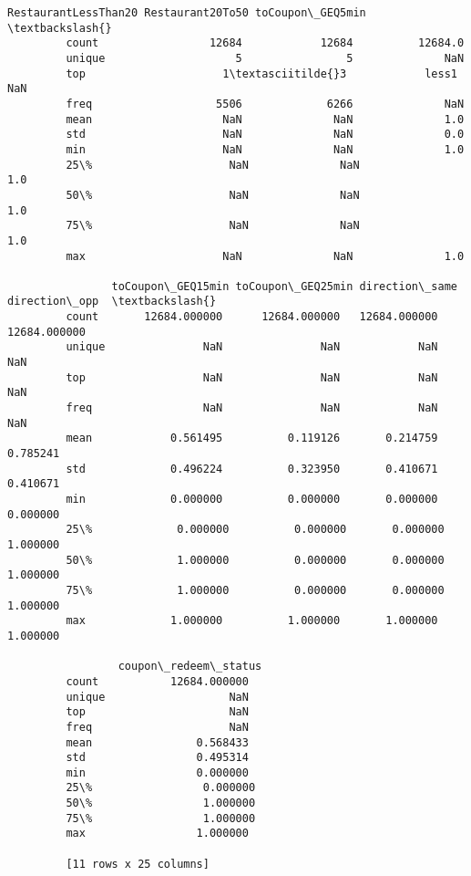 \documentclass[11pt]{article}
\begin{document}
\begin{Verbatim}[commandchars=\\\{\}]
                RestaurantLessThan20 Restaurant20To50 toCoupon\_GEQ5min  \textbackslash{}
         count                 12684            12684          12684.0   
         unique                    5                5              NaN   
         top                     1\textasciitilde{}3            less1              NaN   
         freq                   5506             6266              NaN   
         mean                    NaN              NaN              1.0   
         std                     NaN              NaN              0.0   
         min                     NaN              NaN              1.0   
         25\%                     NaN              NaN              1.0   
         50\%                     NaN              NaN              1.0   
         75\%                     NaN              NaN              1.0   
         max                     NaN              NaN              1.0   
         
                toCoupon\_GEQ15min toCoupon\_GEQ25min direction\_same direction\_opp  \textbackslash{}
         count       12684.000000      12684.000000   12684.000000  12684.000000   
         unique               NaN               NaN            NaN           NaN   
         top                  NaN               NaN            NaN           NaN   
         freq                 NaN               NaN            NaN           NaN   
         mean            0.561495          0.119126       0.214759      0.785241   
         std             0.496224          0.323950       0.410671      0.410671   
         min             0.000000          0.000000       0.000000      0.000000   
         25\%             0.000000          0.000000       0.000000      1.000000   
         50\%             1.000000          0.000000       0.000000      1.000000   
         75\%             1.000000          0.000000       0.000000      1.000000   
         max             1.000000          1.000000       1.000000      1.000000   
         
                 coupon\_redeem\_status  
         count           12684.000000  
         unique                   NaN  
         top                      NaN  
         freq                     NaN  
         mean                0.568433  
         std                 0.495314  
         min                 0.000000  
         25\%                 0.000000  
         50\%                 1.000000  
         75\%                 1.000000  
         max                 1.000000  
         
         [11 rows x 25 columns]
\end{Verbatim}
            
\end{document}
